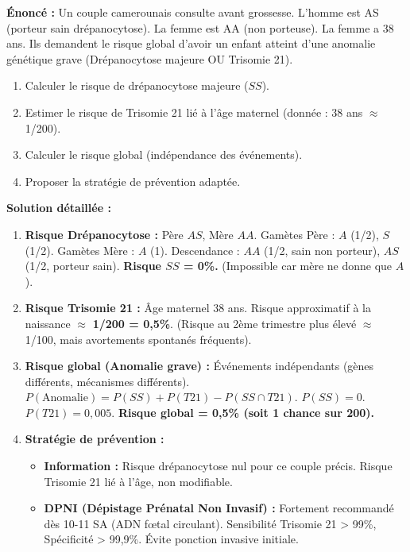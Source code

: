 \documentclass[11pt]{article}
\begin{document}
\begin{exoresolu}
    \textbf{Énoncé :} Un couple camerounais consulte avant grossesse. L'homme est AS (porteur sain drépanocytose). La femme est AA (non porteuse). La femme a 38 ans. Ils demandent le risque global d'avoir un enfant atteint d'une anomalie génétique grave (Drépanocytose majeure OU Trisomie 21).
    \begin{enumerate}
        \item Calculer le risque de drépanocytose majeure ($SS$).
        \item Estimer le risque de Trisomie 21 lié à l'âge maternel (donnée : 38 ans $\approx$ 1/200).
        \item Calculer le risque global (indépendance des événements).
        \item Proposer la stratégie de prévention adaptée.
    \end{enumerate}
    \tcblower
    \textbf{Solution détaillée :}
    \begin{enumerate}
        \item \textbf{Risque Drépanocytose :} Père $AS$, Mère $AA$.
        Gamètes Père : $A$ (1/2), $S$ (1/2). Gamètes Mère : $A$ (1).
        Descendance : $AA$ (1/2, sain non porteur), $AS$ (1/2, porteur sain).
        \textbf{Risque $SS$ = 0\%.} (Impossible car mère ne donne que $A$).
        \item \textbf{Risque Trisomie 21 :} Âge maternel 38 ans. Risque approximatif à la naissance $\approx$ \textbf{1/200 = 0,5\%}. (Risque au 2ème trimestre plus élevé $\approx$ 1/100, mais avortements spontanés fréquents).
        \item \textbf{Risque global (Anomalie grave) :} Événements indépendants (gènes différents, mécanismes différents).
        $P(\text{Anomalie}) = P(SS) + P(T21) - P(SS \cap T21)$.
        $P(SS) = 0$. $P(T21) = 0,005$.
        \textbf{Risque global = 0,5\% (soit 1 chance sur 200).}
        \item \textbf{Stratégie de prévention :}
        \begin{itemize}
            \item \textbf{Information :} Risque drépanocytose nul pour ce couple précis. Risque Trisomie 21 lié à l'âge, non modifiable.
            \item \textbf{DPNI (Dépistage Prénatal Non Invasif) :} Fortement recommandé dès 10-11 SA (ADN fœtal circulant). Sensibilité Trisomie 21 > 99\%, Spécificité > 99,9\%. Évite ponction invasive initiale.

\end{itemize}
\end{enumerate}
\end{exoresolu}
\end{document}
